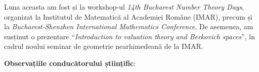 Luna aceasta am fost și la workshop-ul \textit{14th Bucharest Number Theory Days}, organizat la Institutul de Matematică al Academiei Române (IMAR), precum și la \textit{Bucharest-Shenzhen International Mathematics Conference}. De asemenea, am susținut o prezentare ``\textit{Introduction to valuation theory and Berkovich spaces}'', în cadrul noului seminar de geometrie nearhimedeană de la IMAR.

\textbf{Observațiile conducătorului științific}:


